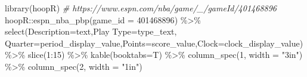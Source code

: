 \documentclass[
  11pt,
]{book}
\newenvironment{Shaded}{\begin{snugshade}}{\end{snugshade}}
\newcommand{\AttributeTok}[1]{\textcolor[rgb]{0.77,0.63,0.00}{#1}}
\newcommand{\CommentTok}[1]{\textcolor[rgb]{0.56,0.35,0.01}{\textit{#1}}}
\newcommand{\DecValTok}[1]{\textcolor[rgb]{0.00,0.00,0.81}{#1}}
\newcommand{\FunctionTok}[1]{\textcolor[rgb]{0.00,0.00,0.00}{#1}}
\newcommand{\NormalTok}[1]{#1}
\newcommand{\OtherTok}[1]{\textcolor[rgb]{0.56,0.35,0.01}{#1}}
\newcommand{\SpecialCharTok}[1]{\textcolor[rgb]{0.00,0.00,0.00}{#1}}
\newcommand{\StringTok}[1]{\textcolor[rgb]{0.31,0.60,0.02}{#1}}
\theoremstyle{definition}
\theoremstyle{definition}
\theoremstyle{definition}
\theoremstyle{definition}
\theoremstyle{remark}
\begin{document}
\begin{Shaded}
\begin{Highlighting}[]
\FunctionTok{library}\NormalTok{(hoopR)}
\CommentTok{\# https://www.espn.com/nba/game/\_/gameId/401468896}
\NormalTok{hoopR}\SpecialCharTok{::}\FunctionTok{espn\_nba\_pbp}\NormalTok{(}\AttributeTok{game\_id =} \DecValTok{401468896}\NormalTok{) }\SpecialCharTok{\%\textgreater{}\%} 
  \FunctionTok{select}\NormalTok{(}\StringTok{\textasciigrave{}}\AttributeTok{Description}\StringTok{\textasciigrave{}}\OtherTok{=}\NormalTok{text,}\StringTok{\textasciigrave{}}\AttributeTok{Play Type}\StringTok{\textasciigrave{}}\OtherTok{=}\NormalTok{type\_text,}
         \AttributeTok{Quarter=}\NormalTok{period\_display\_value,}\AttributeTok{Points=}\NormalTok{score\_value,}\AttributeTok{Clock=}\NormalTok{clock\_display\_value) }\SpecialCharTok{\%\textgreater{}\%}
  \FunctionTok{slice}\NormalTok{(}\DecValTok{1}\SpecialCharTok{:}\DecValTok{15}\NormalTok{) }\SpecialCharTok{\%\textgreater{}\%}
  \FunctionTok{kable}\NormalTok{(}\AttributeTok{booktabs=}\NormalTok{T) }\SpecialCharTok{\%\textgreater{}\%}
  \FunctionTok{column\_spec}\NormalTok{(}\DecValTok{1}\NormalTok{, }\AttributeTok{width =} \StringTok{"3in"}\NormalTok{) }\SpecialCharTok{\%\textgreater{}\%}
  \FunctionTok{column\_spec}\NormalTok{(}\DecValTok{2}\NormalTok{, }\AttributeTok{width =} \StringTok{"1in"}\NormalTok{)}
\end{Highlighting}
\end{Shaded}
\end{document}
